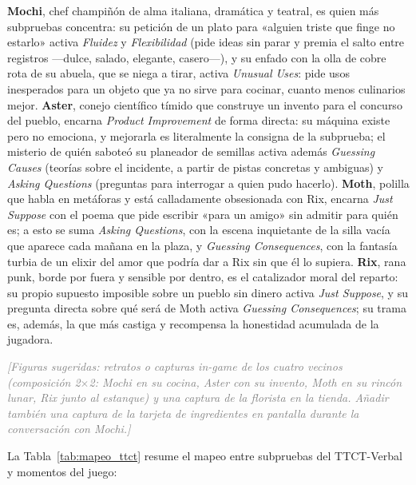 \documentclass[12pt,twoside,titlepage]{report}
\begin{document}
\textbf{Mochi}, chef champiñón de alma italiana, dramática y teatral, es quien más subpruebas concentra: su petición de un plato para «alguien triste que finge no estarlo» activa \textit{Fluidez} y \textit{Flexibilidad} (pide ideas sin parar y premia el salto entre registros ---dulce, salado, elegante, casero---), y su enfado con la olla de cobre rota de su abuela, que se niega a tirar, activa \textit{Unusual Uses}: pide usos inesperados para un objeto que ya no sirve para cocinar, cuanto menos culinarios mejor. \textbf{Aster}, conejo científico tímido que construye un invento para el concurso del pueblo, encarna \textit{Product Improvement} de forma directa: su máquina existe pero no emociona, y mejorarla es literalmente la consigna de la subprueba; el misterio de quién saboteó su planeador de semillas activa además \textit{Guessing Causes} (teorías sobre el incidente, a partir de pistas concretas y ambiguas) y \textit{Asking Questions} (preguntas para interrogar a quien pudo hacerlo). \textbf{Moth}, polilla que habla en metáforas y está calladamente obsesionada con Rix, encarna \textit{Just Suppose} con el poema que pide escribir «para un amigo» sin admitir para quién es; a esto se suma \textit{Asking Questions}, con la escena inquietante de la silla vacía que aparece cada mañana en la plaza, y \textit{Guessing Consequences}, con la fantasía turbia de un elixir del amor que podría dar a Rix sin que él lo supiera. \textbf{Rix}, rana punk, borde por fuera y sensible por dentro, es el catalizador moral del reparto: su propio supuesto imposible sobre un pueblo sin dinero activa \textit{Just Suppose}, y su pregunta directa sobre qué será de Moth activa \textit{Guessing Consequences}; su trama es, además, la que más castiga y recompensa la honestidad acumulada de la jugadora.

\textcolor{gray}{\textit{[Figuras sugeridas: retratos o capturas in-game de los cuatro vecinos (composición 2$\times$2: Mochi en su cocina, Aster con su invento, Moth en su rincón lunar, Rix junto al estanque) y una captura de la florista en la tienda. Añadir también una captura de la tarjeta de ingredientes en pantalla durante la conversación con Mochi.]}}

La Tabla~\ref{tab:mapeo_ttct} resume el mapeo entre subpruebas del TTCT-Verbal y momentos del juego:
\end{document}
